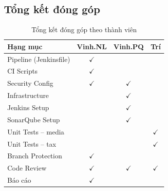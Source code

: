 \subsection{Tổng kết đóng góp}
\begin{table}[H]
\centering
\caption{Tổng kết đóng góp theo thành viên}
\begin{tabular}{|l|c|c|c|}
\hline
\textbf{Hạng mục} & \textbf{Vinh.NL} & \textbf{Vinh.PQ} & \textbf{Trí} \\
\hline
Pipeline (Jenkinsfile) & $\checkmark$ & & \\
\hline
CI Scripts & $\checkmark$ & & \\
\hline
Security Config & $\checkmark$ & $\checkmark$ & \\
\hline
Infrastructure & & $\checkmark$ & \\
\hline
Jenkins Setup & & $\checkmark$ & \\
\hline
SonarQube Setup & & $\checkmark$ & \\
\hline
Unit Tests -- media & & & $\checkmark$ \\
\hline
Unit Tests -- tax & & & $\checkmark$ \\
\hline
Branch Protection & $\checkmark$ & & \\
\hline
Code Review & $\checkmark$ & $\checkmark$ & $\checkmark$ \\
\hline
Báo cáo & $\checkmark$ & & \\
\hline
\end{tabular}
\end{table}
